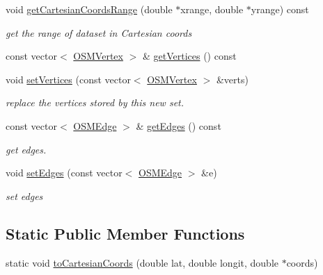 \begin{DoxyCompactItemize}
\item 
void \hyperlink{classbridges_1_1dataset_1_1_o_s_m_data_aa3341a32cd37df602b6f53f2e3cab92b}{get\+Cartesian\+Coords\+Range} (double $\ast$xrange, double $\ast$yrange) const
\begin{DoxyCompactList}\small\item\em get the range of dataset in Cartesian coords \end{DoxyCompactList}\item 
const vector$<$ \hyperlink{classbridges_1_1dataset_1_1_o_s_m_vertex}{O\+S\+M\+Vertex} $>$ \& \hyperlink{classbridges_1_1dataset_1_1_o_s_m_data_a193ff44cf3871a6ef4c4194fa450c5be}{get\+Vertices} () const
\item 
void \hyperlink{classbridges_1_1dataset_1_1_o_s_m_data_aa146cdbf046fa06cd16f654518e3f4e2}{set\+Vertices} (const vector$<$ \hyperlink{classbridges_1_1dataset_1_1_o_s_m_vertex}{O\+S\+M\+Vertex} $>$ \&verts)
\begin{DoxyCompactList}\small\item\em replace the vertices stored by this new set. \end{DoxyCompactList}\item 
const vector$<$ \hyperlink{classbridges_1_1dataset_1_1_o_s_m_edge}{O\+S\+M\+Edge} $>$ \& \hyperlink{classbridges_1_1dataset_1_1_o_s_m_data_afdc974e2356643768024ebaae985ef24}{get\+Edges} () const
\begin{DoxyCompactList}\small\item\em get edges. \end{DoxyCompactList}\item 
void \hyperlink{classbridges_1_1dataset_1_1_o_s_m_data_a42b2ef6edfd00c224949233f6bf18602}{set\+Edges} (const vector$<$ \hyperlink{classbridges_1_1dataset_1_1_o_s_m_edge}{O\+S\+M\+Edge} $>$ \&e)
\begin{DoxyCompactList}\small\item\em set edges \end{DoxyCompactList}\end{DoxyCompactItemize}
\subsection*{Static Public Member Functions}
\begin{DoxyCompactItemize}
\item 
static void \hyperlink{classbridges_1_1dataset_1_1_o_s_m_data_a519483237352f16f0405137138ee2bd1}{to\+Cartesian\+Coords} (double lat, double longit, double $\ast$coords)
\end{DoxyCompactItemize}


